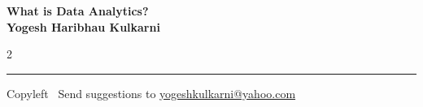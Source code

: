 \documentclass[8pt,landscape]{article}
\begin{document}
\footnotesize


\begin{center}
\Large{\textbf{What is Data Analytics?\\ Yogesh Haribhau Kulkarni}}  
\end{center}

\begin{multicols}{2}

\end{multicols}

\rule{\linewidth}{0.25pt}
\scriptsize
Copyleft \textcopyleft\  Send suggestions to 
\href{http://yati.io}{yogeshkulkarni@yahoo.com}
\end{document}
